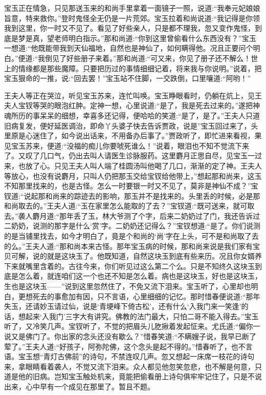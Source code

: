 \begin{parag}
    宝玉正在情急，只见那送玉来的和尚手里拿着一面镜子一照，说道:“我奉元妃娘娘旨意，特来救你。”登时鬼怪全无仍是一片荒郊。宝玉拉着和尚说道:“我记得是你领我到这里，你一时又不见了。看见了好些亲人，只是都不理我，忽又变作鬼怪，到底是梦是真，望老师明白指示。”那和尚道:“你到这里曾偷看什么东西没有？”宝玉一想道:“他既能带我到天仙福地，自然也是神仙了，如何瞒得他。况且正要问个明白。”便道:“我倒见了好些册子来着。”那和尚道:“可又来，你见了册子还不解么！世上的情缘都是那些魔障。只要把历过的事情细细记着，将来我与你说明。”说着，把宝玉狠命的一推，说:“回去罢！”宝玉站不住脚，一交跌倒，口里嚷道:“阿哟！”
\end{parag}


\begin{parag}
    王夫人等正在哭泣，听见宝玉苏来，连忙叫唤。宝玉睁眼看时，仍躺在炕上，见王夫人宝钗等哭的眼泡红肿。定神一想，心里说道:“是了，我是死去过来的。”遂把神魂所历的事呆呆的细想，幸喜多还记得，便哈哈的笑道:“是了，是了。”王夫人只道旧病复发，便好延医调治，即命丫头婆子快去告诉贾政，说是”宝玉回过来了，头里原是心迷住了，如今说出话来，不用备办后事了。”贾政听了，即忙进来看视，果见宝玉苏来，便道:“没福的痴儿你要唬死谁么！”说着，眼泪也不知不觉流下来了。又叹了几口气，仍出去叫人请医生诊脉服药。这里麝月正思自尽，见宝玉一过来，也放了心。只见王夫人叫人端了桂圆汤叫他喝了几口，渐渐的定了神。王夫人等放心，也没有说麝月，只叫人仍把那玉交给宝钗给他带上，”想起那和尚来，这玉不知那里找来的，也是古怪。怎么一时要银一时又不见了，莫非是神仙不成？”宝钗道:“说起那和尚来的踪迹去的影响，那玉并不是找来的。头里丢的时候，必是那和尚取去的。”王夫人道:“玉在家里怎么能取的了去？”宝钗道:“既可送来，就可取去。”袭人麝月道:“那年丢了玉，林大爷测了个字，后来二奶奶过了门，我还告诉过二奶奶，说测的那字是什么‘赏’字。二奶奶还记得么？”宝钗想道:“是了。你们说测的是当铺里找去，如今才明白了，竟是个和尚的‘尚’字在上头，可不是和尚取了去的么。”王夫人道:“那和尚本来古怪。那年宝玉病的时候，那和尚来说是我们家有宝贝可解，说的就是这块玉了。他既知道，自然这块玉到底有些来历。况且你女婿养下来就嘴里含着的。古往今来，你们听见过这么第二个么。只是不知终久这块玉到底是怎么着，就连咱们这一个也还不知是怎么着。病也是这块玉，好也是这块玉，生也是这块玉——”说到这里忽然住了，不免又流下泪来。宝玉听了，心里却也明白，更想死去的事愈加有因，只不言语，心里细细的记忆。那时惜春便说道:“那年失玉，还请妙玉请过仙，说是‘青埂峰下倚古松’，还有什么‘入我门来一笑逢’的话，想起来‘入我门’三字大有讲究。佛教的法门最大，只怕二哥不能入得去。”宝玉听了，又冷笑几声。宝钗听了，不觉的把眉头儿肐揪着发起怔来。尤氏道:“偏你一说又是佛门了。你出家的念头还没有歇么？”惜春笑道:“不瞒嫂子说，我早已断了荤了。”王夫人道:“好孩子，阿弥陀佛，这个念头是起不得的。”惜春听了，也不言语。宝玉想“青灯古佛前”的诗句，不禁连叹几声。忽又想起一床席一枝花的诗句来，拿眼睛看着袭人，不觉又流下泪来。众人都见他忽笑忽悲，也不解是何意，只道是他的旧病。岂知宝玉触处机来，竟能把偷看册上诗句俱牢牢记住了，只是不说出来，心中早有一个成见在那里了。暂且不题。
\end{parag}


